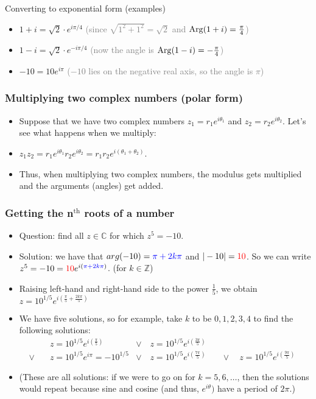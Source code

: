 \begin{frame}{Converting to exponential form (examples)}
    \begin{itemize}
        \item\pause  $1+i=\sqrt{2}\cdot e^{i\pi/4}$ \textcolor{gray}{(since $\sqrt{1^2+1^2}=\sqrt{2}$ and $\operatorname{Arg}(1+i)=\frac{\pi}{4}$)}
        \item\pause  $1-i=\sqrt{2}\cdot e^{-i\pi/4}$ \textcolor{gray}{(now the angle is $\operatorname{Arg}(1-i)=-\frac{\pi}{4}$)}
        \item\pause  $-10=10e^{i\pi}$ \textcolor{gray}{($-10$ lies on the negative real axis, so the angle is $\pi$)}
    \end{itemize}

    
\end{frame}

\begin{frame}
\frametitle{Multiplying two complex numbers (polar form)}
\begin{itemize}
\item Suppose that we have two complex numbers $z_1=r_1 e^{i\theta_1}$ and $z_2=r_2 e^{i\theta_2}$. Let's see what happens when we multiply:
\pause\item $z_1z_2=r_1e^{i\theta_1}r_2 e^{i\theta_2}=r_1r_2e^{i(\theta_1+\theta_2)}$.
\pause\item Thus, when multiplying two complex numbers, the modulus gets multiplied and the arguments (angles) get added.
\end{itemize}
\end{frame}

\begin{frame}
\frametitle{Getting the n$^\text{th}$ roots of a number}
\begin{itemize}
\item Question: find all $z\in\mathbb{C}$ for which $z^5=-10$.
\pause\item Solution: we have that $arg(-10)=\textcolor{blue}{\pi+2k\pi}$ and $|-10|=\textcolor{red}{10}$. \pause So we can write $z^5=-10=\textcolor{red}{10}e^{i(\textcolor{blue}{\pi+2k\pi})}$. {\scriptsize(for $k\in\mathbb{Z}$)}
\pause\item Raising left-hand and right-hand side to the power $\frac{1}{5}$, we obtain $z=10^{1/5}e^{i(\frac{\pi}{5}+\frac{2k\pi}{5})}$
\pause\item We have five solutions, so for example, take $k$ to be $0,1,2,3,4$ to find the following solutions:
\begin{align*}
&z=10^{1/5}e^{i(\frac{\pi}{5})} \quad&\lor\quad   z=10^{1/5}e^{i(\frac{3\pi}{5})} &&\\
\lor\quad & z=10^{1/5}e^{i\pi}=-10^{1/5}  &\lor\quad
z=10^{1/5}e^{i(\frac{7\pi}{5})}   &\quad\lor\quad 
z=10^{1/5}e^{i(\frac{9\pi}{5})} & 
\end{align*}
\pause\item (These are all solutions: if we were to go on for $k=5,6,\hdots$, then the solutions would repeat because sine and cosine (and thus, $e^{i\theta})$ have a period of $2\pi$.)
\end{itemize}
\end{frame}

